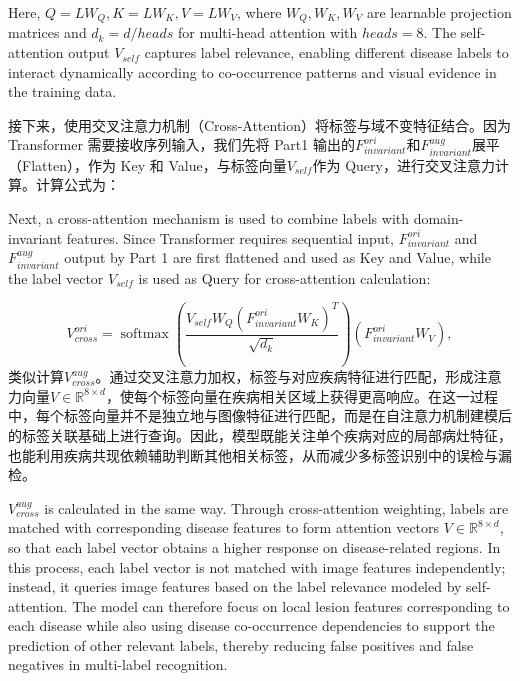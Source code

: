 Here, \(Q = LW_{Q},K = LW_{K},V = LW_{V}\), where \(W_{Q},W_{K},W_{V}\) are learnable projection matrices and \(d_{k} = d/heads\) for multi-head attention with \(heads=8\). The self-attention output \(V_{self}\) captures label relevance, enabling different disease labels to interact dynamically according to co-occurrence patterns and visual evidence in the training data.

接下来，使用交叉注意力机制（Cross-Attention）将标签与域不变特征结合。因为 Transformer 需要接收序列输入，我们先将 Part1 输出的\(F_{invariant}^{ori}\)和\(F_{invariant}^{aug}\)展平（Flatten），作为 Key 和 Value，与标签向量\(V_{self}\)作为 Query，进行交叉注意力计算。计算公式为：

Next, a cross-attention mechanism is used to combine labels with domain-invariant features. Since Transformer requires sequential input, \(F_{invariant}^{ori}\) and \(F_{invariant}^{aug}\) output by Part 1 are first flattened and used as Key and Value, while the label vector \(V_{self}\) is used as Query for cross-attention calculation:

\begin{equation}\label{eq:cross-attention}
V_{cross}^{ori} = \operatorname{softmax}\left(\frac{V_{self}W_{Q}(F_{invariant}^{ori}W_{K})^{T}}{\sqrt{d_{k}}}\right)(F_{invariant}^{ori}W_{V}),
\end{equation}
类似计算\(V_{cross}^{aug}\)。通过交叉注意力加权，标签与对应疾病特征进行匹配，形成注意力向量\(V \in \mathbb{R}^{8 \times d}\)，使每个标签向量在疾病相关区域上获得更高响应。在这一过程中，每个标签向量并不是独立地与图像特征进行匹配，而是在自注意力机制建模后的标签关联基础上进行查询。因此，模型既能关注单个疾病对应的局部病灶特征，也能利用疾病共现依赖辅助判断其他相关标签，从而减少多标签识别中的误检与漏检。

\(V_{cross}^{aug}\) is calculated in the same way. Through cross-attention weighting, labels are matched with corresponding disease features to form attention vectors \(V \in \mathbb{R}^{8 \times d}\), so that each label vector obtains a higher response on disease-related regions. In this process, each label vector is not matched with image features independently; instead, it queries image features based on the label relevance modeled by self-attention. The model can therefore focus on local lesion features corresponding to each disease while also using disease co-occurrence dependencies to support the prediction of other relevant labels, thereby reducing false positives and false negatives in multi-label recognition.

